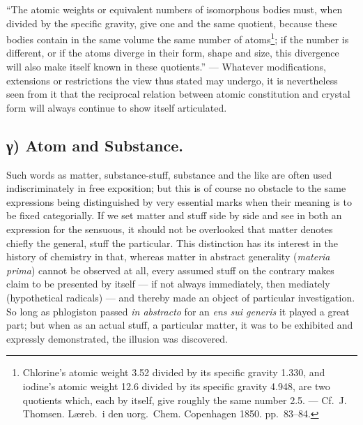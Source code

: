 \documentclass[12pt,a4paper]{book}
\begin{document}
\setcounter{footnote}{0}
``The atomic weights or equivalent numbers of isomorphous bodies must, when
divided by the specific gravity, give one and the same quotient, because these
bodies contain in the same volume the same number of atoms\footnote{Chlorine's
atomic weight 3.52 divided by its specific gravity 1.330, and iodine's atomic
weight 12.6 divided by its specific gravity 4.948, are two quotients which,
each by itself, give roughly the same number 2.5. --- Cf.\ J. Thomsen. Læreb.\
i den uorg.\ Chem. Copenhagen 1850. pp.~83--84.}; if the number is different,
or if the atoms diverge in their form, shape and size, this divergence will
also make itself known in these quotients.'' --- Whatever modifications,
extensions or restrictions the view thus stated may undergo, it is nevertheless
seen from it that the reciprocal relation between atomic constitution and
crystal form will always continue to show itself articulated.

\subsection*{γ) Atom and Substance.}

Such words as matter, substance-stuff, substance and the like are often used
indiscriminately in free exposition; but this is of course no obstacle to the
same expressions being distinguished by very essential marks when their meaning
is to be fixed categorially. If we set matter and stuff side by side and see in
both an expression for the sensuous, it should not be overlooked that matter
denotes chiefly the general, stuff the particular. This distinction has its
interest in the history of chemistry in that, whereas matter in abstract
generality (\textit{materia prima}) cannot be observed at all, every assumed
stuff on the contrary makes claim to be presented by itself --- if not always
immediately, then mediately (hypothetical radicals) --- and thereby made an
object of particular investigation. So long as phlogiston passed
\textit{in abstracto} for
an \textit{ens sui generis} it played a great part; but when as an actual
stuff, a particular matter, it was to be exhibited and expressly demonstrated,
the illusion was discovered.
\end{document}
